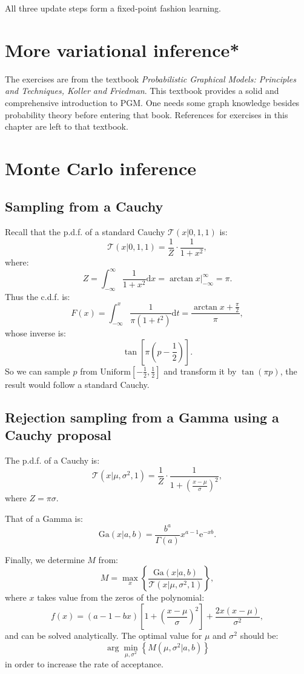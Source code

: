 \documentclass[UTF8]{ctexart}
\begin{document}
All three update steps form a fixed-point fashion learning. 

\newpage
\section{More variational inference*}
The exercises are from the textbook \emph{Probabilistic Graphical Models: Principles and Techniques, Koller and Friedman}.
This textbook provides a solid and comprehensive introduction to PGM. 
One needs some graph knowledge besides probability theory before entering that book. 
References for exercises in this chapter are left to that textbook. 


\newpage
\section{Monte Carlo inference}
\subsection{Sampling from a Cauchy}
Recall that the p.d.f. of a standard Cauchy $\mathcal{T}(x|0,1,1)$ is:
$$\mathcal{T}(x|0,1,1)=\frac{1}{Z}\cdot\frac{1}{1+x^{2}},$$
where:
$$Z=\int_{-\infty}^{\infty}\frac{1}{1+x^{2}}\text{d}x=\arctan x|_{-\infty}^{\infty}=\pi.$$
Thus the c.d.f. is:
$$F(x)=\int_{-\infty}^{x}\frac{1}{\pi(1+t^{2})}\text{d}t=\frac{\arctan x +\frac{\pi}{2}}{\pi},$$
whose inverse is:
$$\tan \left[\pi(p-\frac{1}{2}) \right].$$
So we can sample $p$ from $\text{Uniform}[-\frac{1}{2},\frac{1}{2}]$ and transform it by $\tan (\pi p)$, the result would follow a standard Cauchy.

\subsection{Rejection sampling from a Gamma using a Cauchy proposal}
The p.d.f. of a Cauchy is:
$$\mathcal{T}(x|\mu,\sigma^{2},1)=\frac{1}{Z}\cdot\frac{1}{1+\left( \frac{x-\mu}{\sigma}\right)^{2}},$$
where $Z=\pi\sigma$. 

That of a Gamma is:
$$\text{Ga}(x|a,b)=\frac{b^{a}}{\Gamma(a)}x^{a-1}\text{e}^{-xb}.$$

Finally, we determine $M$ from:
$$M=\max_{x}\left\{\frac{\text{Ga}(x|a,b)}{\mathcal{T}(x|\mu,\sigma^{2},1)} \right\},$$
where $x$ takes value from the zeros of the polynomial:
$$f(x)=(a-1-bx)\left[1+\left(\frac{x-\mu}{\sigma} \right)^{2} \right]+\frac{2x(x-\mu)}{\sigma^{2}},$$
and can be solved analytically.
The optimal value for $\mu$ and $\sigma^{2}$ should be:
$$\arg\min_{\mu,\sigma^{2}}\left\{M(\mu,\sigma^{2}|a,b) \right\}$$
in order to increase the rate of acceptance.
\end{document}
